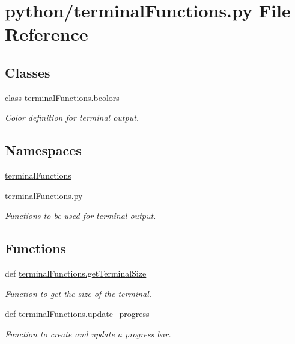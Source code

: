 \section{python/terminal\-Functions.py File Reference}
\label{terminalFunctions_8py}
\subsection*{Classes}
\begin{DoxyCompactItemize}
\item 
class \hyperlink{classterminalFunctions_1_1bcolors}{terminal\-Functions.\-bcolors}
\begin{DoxyCompactList}\small\item\em Color definition for terminal output. \end{DoxyCompactList}\end{DoxyCompactItemize}
\subsection*{Namespaces}
\begin{DoxyCompactItemize}
\item 
\hyperlink{namespaceterminalFunctions}{terminal\-Functions}
\item 
\hyperlink{namespaceterminalFunctions_1_1py}{terminal\-Functions.\-py}
\begin{DoxyCompactList}\small\item\em Functions to be used for terminal output. \end{DoxyCompactList}\end{DoxyCompactItemize}
\subsection*{Functions}
\begin{DoxyCompactItemize}
\item 
def \hyperlink{namespaceterminalFunctions_ae3b93f09175ae50b228328695278decf}{terminal\-Functions.\-get\-Terminal\-Size}
\begin{DoxyCompactList}\small\item\em Function to get the size of the terminal. \end{DoxyCompactList}\item 
def \hyperlink{namespaceterminalFunctions_a46633b22d7441adb4eebbe17b896a4cf}{terminal\-Functions.\-update\-\_\-progress}
\begin{DoxyCompactList}\small\item\em Function to create and update a progress bar. \end{DoxyCompactList}\end{DoxyCompactItemize}
